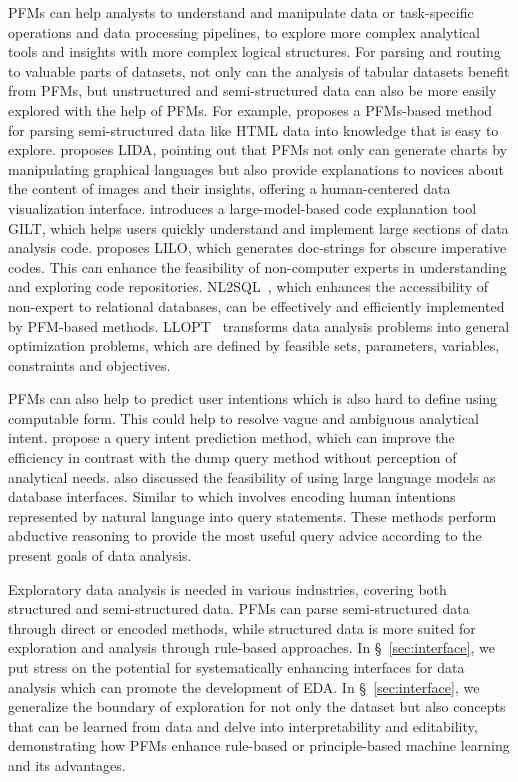   PFMs can help analysts to understand and manipulate data or task-specific operations and data processing pipelines, to explore more complex analytical tools and insights with more complex logical structures. For parsing and routing to valuable parts of datasets, not only can the analysis of tabular datasets benefit from PFMs, but unstructured and semi-structured data can also be more easily explored with the help of PFMs. For example, \cite{ko2024filling} proposes a PFMs-based method for parsing semi-structured data like HTML data into knowledge that is easy to explore. \cite{Dibia2023LIDAAT} proposes LIDA, pointing out that PFMs not only can generate charts by manipulating graphical languages but also provide explanations to novices about the content of images and their insights, offering a human-centered data visualization interface. \cite{nam2024using} introduces a large-model-based code explanation tool GILT, which helps users quickly understand and implement large sections of data analysis code. \cite{GrandWBOLTA24} proposes LILO, which generates doc-strings for obscure imperative codes. This can enhance the feasibility of non-computer experts in understanding and exploring code repositories. NL2SQL~\cite{smalllargemodelNL2SQL,text2sqlevaluation,readyforNL2SQL}, which enhances the accessibility of non-expert to relational databases, can be effectively and efficiently implemented by PFM-based methods. LLOPT~\cite{JiangSQLZZY25} transforms data analysis problems into general optimization problems, which are defined by feasible sets, parameters, variables, constraints and objectives.
  
  PFMs can also help to predict user intentions which is also hard to define using computable form. This could help to resolve vague and ambiguous analytical intent. \cite{dubiel2024device} propose a query intent prediction method, which can improve the efficiency in contrast with the dump query method without perception of analytical needs. \cite{li2024can} also discussed the feasibility of using large language models as database interfaces. Similar to which involves encoding human intentions represented by natural language into query statements. These methods perform abductive reasoning to provide the most useful query advice according to the present goals of data analysis.
  
  Exploratory data analysis is needed in various industries, covering both structured and semi-structured data. PFMs can parse semi-structured data through direct or encoded methods, while structured data is more suited for exploration and analysis through rule-based approaches. In \S~\ref{sec:interface}, we put stress on the potential for systematically enhancing interfaces for data analysis which can promote the development of EDA. In \S~\ref{sec:interface}, we generalize the boundary of exploration for not only the dataset but also concepts that can be learned from data and delve into interpretability and editability, demonstrating how PFMs enhance rule-based or principle-based machine learning and its advantages.

